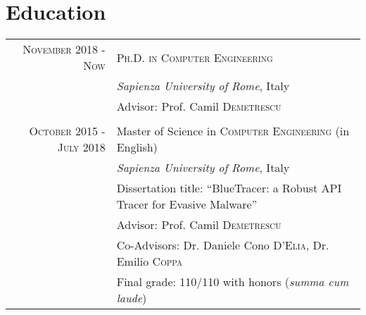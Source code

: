 \documentclass[a4paper,10pt]{article} %
\begin{document}
\section{Education}

\begin{tabular}{rl}	


\textsc{November} 2018 - \textsc{Now} & \textsc{Ph.D. in Computer Engineering}\\%
& \small\emph{Sapienza University of Rome}, Italy \\
& \small Advisor: Prof. Camil \textsc{Demetrescu}\\
&\\

\textsc{October} 2015 - \textsc{July} 2018 & Master of Science in \textsc{Computer Engineering} (in English)\\%
& \small\emph{Sapienza University of Rome}, Italy \\
& \small Dissertation title: “BlueTracer: a Robust API Tracer for Evasive Malware” \\
& \small Advisor: Prof. Camil \textsc{Demetrescu} \\
& \small Co-Advisors: Dr. Daniele Cono \textsc{D'Elia}, Dr. Emilio \textsc{Coppa} \\
& \small Final grade: 110/110 with honors (\emph{summa cum laude})
&\\


\end{tabular}
\end{document}
